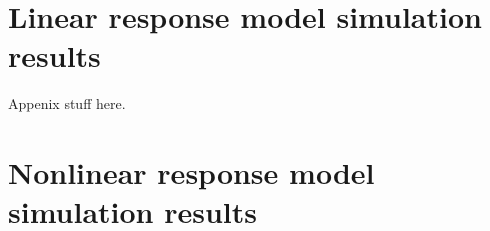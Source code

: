 
\section{Linear response model simulation results}

Appenix stuff here.  

\section{Nonlinear response model simulation results}
